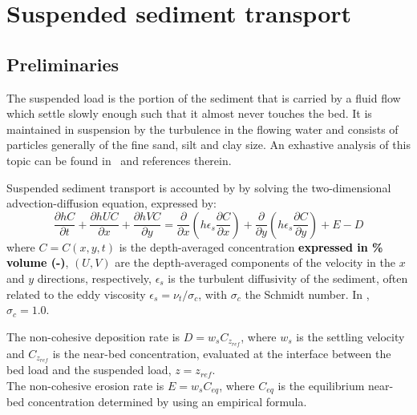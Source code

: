 \chapter[Suspended sediment transport]{Suspended sediment transport}\label{sec:SuspendedSedimentTransport}

\section{Preliminaries}
The suspended load is the portion of the sediment that is carried by a fluid flow which settle slowly enough such that it almost never touches the bed. It is maintained in suspension by the turbulence in the flowing water and consists of particles generally of the fine sand, silt and clay size. An exhastive analysis of this topic can be found in~\cite{GarciaBook2006} and references therein.

Suspended sediment transport is accounted by \sisyphe{} by solving the two-dimensional advection-diffusion equation, expressed by:
\begin{equation}\label{eq:2DADE}
\frac{\partial hC}{\partial t} + \frac{\partial hUC}{\partial x} + \frac{\partial hVC}{\partial y} =
\frac{\partial}{\partial x}\left(h\epsilon_s\frac{\partial C}{\partial x}\right) +
\frac{\partial}{\partial y}\left(h\epsilon_s\frac{\partial C}{\partial y}\right) + E-D
\end{equation}
where $C=C(x,y,t)$ is the depth-averaged concentration \textcolor{black}{\bf expressed in \% volume (-)}, $(U,V)$ are the depth-averaged components of the velocity in the $x$ and $y$ directions, respectively, $\epsilon_s$ is the turbulent diffusivity of the sediment, often related to the eddy viscosity $\epsilon_s=\nu_t/\sigma_c$, with $\sigma_c$ the Schmidt number. In \sisyphe{}, $\sigma_c=1.0$.

The non-cohesive deposition rate is $D = w_s C_{z_{ref}}$, where $w_s$ is the settling velocity and $C_{z_{ref}}$ is the near-bed concentration, evaluated at the interface between the bed load
and the suspended load, $z=z_{ref}$.\\

The non-cohesive erosion rate is $E = w_s C_{eq}$, where $C_{eq}$ is the equilibrium near-bed concentration determined by using an empirical formula.

